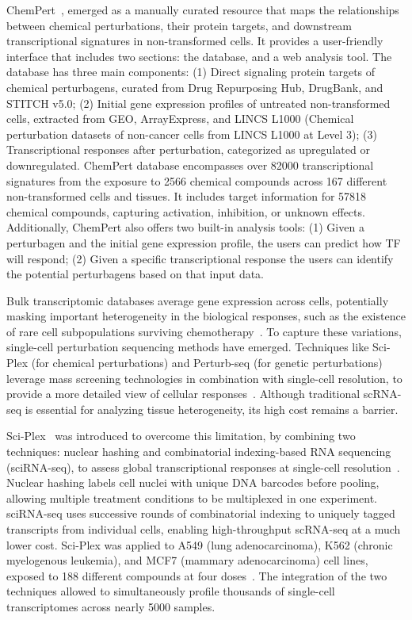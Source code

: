 ChemPert~\cite{RN86}, emerged as a manually curated resource that maps the relationships between chemical perturbations, their protein targets, and downstream transcriptional signatures in non-transformed cells. 
It provides a user-friendly interface that includes two sections: the database, and a web analysis tool. The database has three main components: 
(1) Direct signaling protein targets of chemical perturbagens, curated from Drug Repurposing Hub, DrugBank, and STITCH v5.0; 
(2) Initial gene expression profiles of untreated non-transformed cells, extracted from GEO, ArrayExpress, and LINCS L1000 (Chemical perturbation datasets of non-cancer cells from LINCS L1000 at Level 3); 
(3) Transcriptional responses after perturbation, categorized as upregulated or downregulated. 
ChemPert database encompasses over 82000 transcriptional signatures from the exposure to 2566 chemical compounds across 167 different non-transformed cells and tissues. 
It includes target information for 57818 chemical compounds, capturing activation, inhibition, or unknown effects. 
Additionally, ChemPert also offers two built-in analysis tools: 
(1) Given a perturbagen and the initial gene expression profile, the users can predict how \gls{TF} will respond; 
(2) Given a specific transcriptional response the users can identify the potential perturbagens based on that input data.


Bulk transcriptomic databases average gene expression across cells, potentially masking important heterogeneity in the biological responses, such as the existence of rare cell subpopulations surviving chemotherapy~\cite{RN88}. To capture these variations, single-cell perturbation sequencing methods have emerged. 
Techniques like Sci-Plex (for chemical perturbations) and Perturb-seq (for genetic perturbations) leverage mass screening technologies in combination with single-cell resolution, to provide a more detailed view of cellular responses~\cite{RN97}. 
Although traditional \gls{scRNA-seq} is essential for analyzing tissue heterogeneity, its high cost remains a barrier. 

Sci-Plex~\cite{RN88} was introduced to overcome this limitation, by combining two techniques: nuclear hashing and combinatorial indexing-based RNA sequencing (sciRNA-seq), to assess global transcriptional responses at single-cell resolution~\cite{RN125, RN126}. Nuclear hashing labels cell nuclei with unique \gls{DNA} barcodes before pooling, allowing multiple treatment conditions to be multiplexed in one experiment. sciRNA-seq uses successive rounds of combinatorial indexing to uniquely tagged transcripts from individual cells, enabling high-throughput \gls{scRNA-seq} at a much lower cost.
Sci-Plex was applied to A549 (lung adenocarcinoma), K562 (chronic myelogenous leukemia), and MCF7 (mammary adenocarcinoma) cell lines, exposed to 188 different compounds at four doses~\cite{RN88}. The integration of the two techniques allowed to simultaneously profile thousands of single-cell transcriptomes across nearly 5000 samples. 

